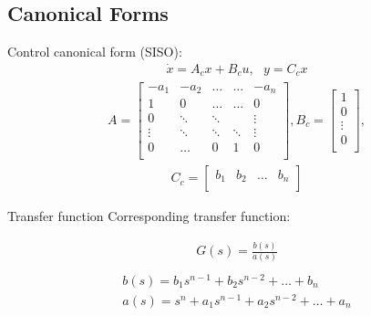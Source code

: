 \subsection{Canonical Forms}
\begin{frame}
Control canonical form (SISO):
\begin{align*}
\dot{x}=A_cx+B_cu,\text{ } y=C_cx
\end{align*}
\vspace{-0.5cm}
\begin{align*}
A = \begin{bmatrix}
       -a_1 & -a_2 & \hdots & \hdots & -a_n\\[0.3em]
       1 & 0 & \hdots & \hdots & 0\\[0.3em]
       0 & \ddots & \ddots &  & \vdots\\[0.3em]
       \vdots & \ddots & \ddots &\ddots  & \vdots\\[0.3em]
       0 & \hdots & 0 & 1 & 0\\[0.3em]
     \end{bmatrix}
, B_c=   \begin{bmatrix}
            1\\
            0\\
            \vdots\\
            0\\
         \end{bmatrix},
\end{align*}
\vspace{-0.5cm}
\begin{align*}
C_c=
\begin{bmatrix}
    b_1 & b_2 & \hdots & b_n\\
\end{bmatrix}
\end{align*}
\end{frame}

\begin{frame}{Transfer function}
Corresponding transfer function:

\begin{align*}
G(s)=\frac{b(s)}{a(s)}\\
\end{align*}
\vspace{-1.5cm}
\begin{align*}
b(s)=b_1s^{n-1}+b_2s^{n-2}+\hdots+b_n\\
a(s)=s^n+a_1s^{n-1}+a_2s^{n-2}+\hdots+a_n
\end{align*}
\end{frame}


